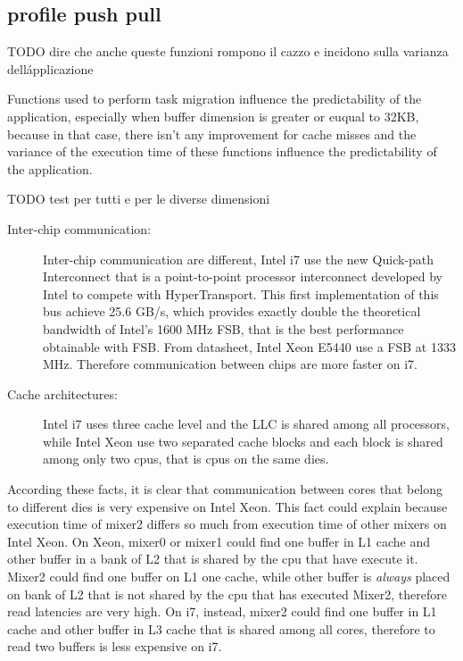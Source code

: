\subsection{profile push pull}

TODO dire che anche queste funzioni rompono il cazzo e incidono sulla varianza dell\'applicazione

Functions used to perform task migration influence the predictability of the application, especially when buffer dimension is greater or euqual to 32KB, 
because in that case, there isn't any improvement for cache misses and the variance of the execution time of these functions influence the predictability
of the application. 



TODO test per tutti e per le diverse dimensioni




\begin{description}

\item[Inter-chip communication:] Inter-chip communication are different, Intel i7 use the new Quick-path Interconnect that is a point-to-point processor 
interconnect developed by Intel to compete with HyperTransport. This first implementation of this bus achieve 25.6 GB/s, which provides exactly double the 
theoretical bandwidth of Intel's 1600 MHz FSB, that is the best performance obtainable with FSB. From datasheet, Intel Xeon E5440 use a FSB at 1333 MHz.
Therefore communication between chips are more faster on i7.

\item[Cache architectures:] Intel i7 uses three cache level and the LLC is shared among all processors, while Intel Xeon use two separated cache 
blocks and each block is shared among only two cpus, that is cpus on the same dies.
\end{description}

According these facts, it is clear that communication between cores that belong to different dies is very expensive on Intel Xeon. This fact could explain 
because execution time of mixer2 differs so much from execution time of other mixers on Intel Xeon. On Xeon, mixer0 or mixer1 could find one buffer 
in L1 cache and other buffer in a bank of L2 that is shared by the cpu that have execute it. Mixer2 could find one buffer on L1 one cache, while 
other buffer is \textit{always} placed on bank of L2 that is not shared by the cpu that has executed Mixer2, therefore read latencies are very high. 
On i7, instead, mixer2 could find one buffer in L1 cache and other buffer in L3 cache that is shared among all cores, therefore to read two buffers is 
less expensive on i7.

